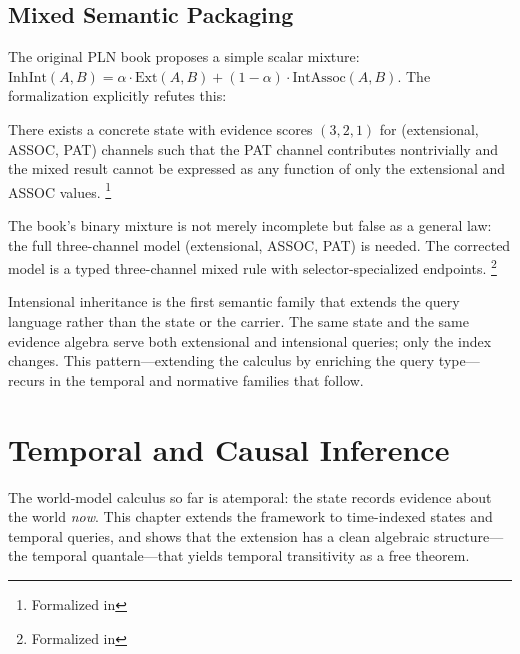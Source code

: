 \documentclass[11pt,openany]{report}
\begin{document}
\section{Mixed Semantic Packaging}

The original PLN book proposes a simple scalar mixture:
$\mathrm{InhInt}(A, B) = \alpha \cdot \mathrm{Ext}(A, B)
+ (1 - \alpha) \cdot \mathrm{IntAssoc}(A, B)$.  The formalization
explicitly refutes this:

\begin{theorem}
\label{thm:no-mixed-policy}
There exists a concrete state with evidence scores $(3, 2, 1)$ for
(extensional, ASSOC, PAT) channels such that the PAT channel
contributes nontrivially and the mixed result cannot be expressed
as any function of only the extensional and ASSOC values.%
\footnote{Formalized in
}
\end{theorem}

\noindent
The book's binary mixture is not merely incomplete but false as a
general law: the full three-channel model (extensional, ASSOC, PAT)
is needed.  The corrected model is a typed three-channel mixed
rule with selector-specialized endpoints.%
\footnote{Formalized in
}

\medskip\noindent
Intensional inheritance is the first semantic family that extends
the query language rather than the state or the carrier.  The
same state and the same evidence algebra serve both extensional and
intensional queries; only the  index
changes.  This pattern---extending the calculus by enriching the
query type---recurs in the temporal and normative families that
follow.



\chapter{Temporal and Causal Inference}
\label{ch:temporal}

The world-model calculus so far is atemporal: the state records
evidence about the world \emph{now}.  This chapter extends the
framework to time-indexed states and temporal queries, and shows
that the extension has a clean algebraic structure---the temporal
quantale---that yields temporal transitivity as a free theorem.
\end{document}

